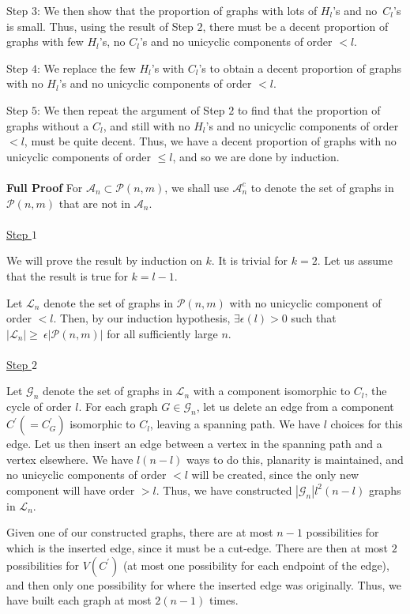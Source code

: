 \documentclass{article}
\newtheorem{Proof of Theorem}{Proof of Theorem}
\begin{document}
Step $3$:
We then show that the proportion of graphs with lots of $H_{l}$'s and no~$C_{l}$'s is small.
Thus, using the result of Step $2$,
there must be a decent proportion of graphs with few $H_{l}$'s, no $C_{l}$'s and no unicyclic components of order $<l$.

Step $4$:
We replace the few $H_{l}$'s with $C_{l}$'s to obtain a decent proportion of graphs 
with no $H_{l}$'s and no unicyclic components of order $<l$.

Step $5$:
We then repeat the argument of Step $2$ to find that the proportion of graphs without a $C_{l}$,
and still with no $H_{l}$'s and no unicyclic components of order $<l$,
must be quite decent.
Thus, we have a decent proportion of graphs with no unicyclic components of order $\leq l$,
and so we are done by induction. \\
\\
\textbf{Full Proof}
For $\mathcal{A}_{n} \subset \mathcal{P}(n,m)$,
we shall use $\mathcal{A}_{n}^{c}$ to denote the set of graphs in $\mathcal{P}(n,m)$ that are not in $\mathcal{A}_{n}$. \\
\\
\underline{Step $1$} 

We will prove the result by induction on $k$.
It is trivial for $k=2$.
Let us assume that the result is true for $k=l-1$.

Let $\mathcal{L}_{n}$ denote the set of graphs in $\mathcal{P}(n,m)$ with no unicyclic component of order $<l$.
Then, by our induction hypothesis,
$\exists \epsilon (l) > 0$ such that
$|\mathcal{L}_{n}| \!\geq~\!\epsilon |\mathcal{P}(n,m)|$ for all sufficiently large $n$. \\
\\
\underline{Step $2$} 

Let $\mathcal{G}_{n}$ denote the set of graphs in $\mathcal{L}_{n}$ with a component isomorphic to $C_{l}$,
the cycle of order $l$.
For each graph $G \in \mathcal{G}_{n}$,
let us delete an edge from a component $C^{\prime} (=C^{\prime}_{G})$ isomorphic to $C_{l}$,
leaving a spanning path. 
We have $l$ choices for this edge.
Let us then insert an edge between a vertex in the spanning path and a vertex elsewhere.
We have $l(n-l)$ ways to do this, planarity is maintained, and no unicyclic components of order $<l$ will be created,
since the only new component will have order $>l$.
Thus, we have constructed $|\mathcal{G}_{n}|l^{2}(n-l)$ graphs in $\mathcal{L}_{n}$.

Given one of our constructed graphs,
there are at most $n-1$ possibilities for which is the inserted edge,
since it must be a cut-edge.
There are then at most $2$ possibilities for $V(C^{\prime})$ (at most one possibility for each endpoint of the edge),
and then only one possibility for where the inserted edge was originally.
Thus, we have built each graph at most $2(n-1)$ times.
\end{document}
